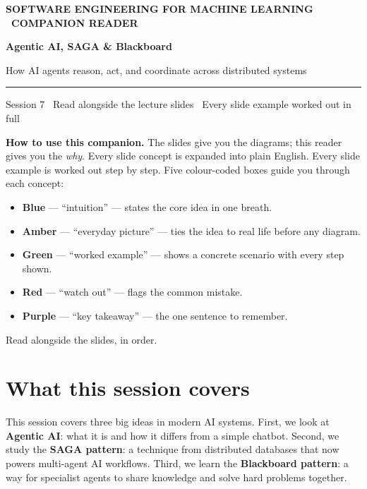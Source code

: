 \documentclass[a4paper,11pt]{article}
\providecommand{\addfontfeatureslike}[1]{#1}
\newcommand{\titlebanner}[4]{%
  \begin{tcolorbox}[
    enhanced, breakable=false,
    colback=navy, colframe=navy,
    boxrule=0pt, arc=3pt, outer arc=3pt,
    left=16pt, right=16pt, top=16pt, bottom=16pt,
    before skip=2pt, after skip=14pt,
    width=\linewidth ]
    {\sffamily\footnotesize\bfseries\color{white!85}%
      \MakeUppercase{\addfontfeatureslike{#1}}}\par
    \vspace{6pt}
    {\sffamily\bfseries\fontsize{30}{34}\selectfont\color{white} #2\par}
    \vspace{5pt}
    {\sffamily\large\color{white!88} #3\par}
    \vspace{9pt}
    {\color{white!55}\rule{\linewidth}{0.4pt}}\par
    \vspace{6pt}
    {\sffamily\footnotesize\color{white!82} #4\par}
  \end{tcolorbox}%
}
\newcommand{\vocab}[1]{\textbf{\color{navy}#1}}
\begin{document}

\thispagestyle{fancy}

\titlebanner
  {Software Engineering for Machine Learning \textperiodcentered\ Companion Reader}
  {Agentic AI, SAGA \& Blackboard}
  {How AI agents reason, act, and coordinate across distributed systems}
  {Session 7 \textperiodcentered\ Read alongside the lecture slides \textperiodcentered\ Every slide example worked out in full}

\noindent\textbf{How to use this companion.}
The slides give you the diagrams; this reader gives you the \emph{why}.
Every slide concept is expanded into plain English.
Every slide example is worked out step by step.
Five colour-coded boxes guide you through each concept:
\begin{itemize}
  \item \textcolor{intuFrame}{\textbf{Blue}} --- ``intuition'' --- states the core idea in one breath.
  \item \textcolor{everyFrame}{\textbf{Amber}} --- ``everyday picture'' --- ties the idea to real life before any diagram.
  \item \textcolor{workFrame}{\textbf{Green}} --- ``worked example'' --- shows a concrete scenario with every step shown.
  \item \textcolor{watchFrame}{\textbf{Red}} --- ``watch out'' --- flags the common mistake.
  \item \textcolor{keyFrame}{\textbf{Purple}} --- ``key takeaway'' --- the one sentence to remember.
\end{itemize}
Read alongside the slides, in order.

\medskip

\section{What this session covers}

This session covers three big ideas in modern AI systems.
First, we look at \vocab{Agentic AI}: what it is and how it differs from a simple chatbot.
Second, we study the \vocab{SAGA pattern}: a technique from distributed databases that now powers multi-agent AI workflows.
Third, we learn the \vocab{Blackboard pattern}: a way for specialist agents to share knowledge and solve hard problems together.
\end{document}
